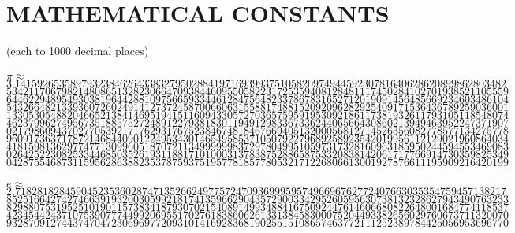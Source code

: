\documentclass{tufte-book}
\begin{document}
\section{MATHEMATICAL CONSTANTS}
(each to 1000 decimal places)
\\~\\$\pi\approx$\\
$3.14159265358979323846264338327950288419716939937510582097494459230781640628620899862803482$\\
$5342117067982148086513282306647093844609550582231725359408128481117450284102701938521105559$\\
$6446229489549303819644288109756659334461284756482337867831652712019091456485669234603486104$\\
$5432664821339360726024914127372458700660631558817488152092096282925409171536436789259036001$\\
$1330530548820466521384146951941511609433057270365759591953092186117381932611793105118548074$\\
$4623799627495673518857527248912279381830119491298336733624406566430860213949463952247371907$\\
$0217986094370277053921717629317675238467481846766940513200056812714526356082778577134275778$\\
$9609173637178721468440901224953430146549585371050792279689258923542019956112129021960864034$\\
$4181598136297747713099605187072113499999983729780499510597317328160963185950244594553469083$\\
$0264252230825334468503526193118817101000313783875288658753320838142061717766914730359825349$\\
$0428755468731159562863882353787593751957781857780532171226806613001927876611195909216420199$
\\~\\
$e\approx$\\
$2.71828182845904523536028747135266249775724709369995957496696762772407663035354759457138217$\\
$8525166427427466391932003059921817413596629043572900334295260595630738132328627943490763233$\\
$8298807531952510190115738341879307021540891499348841675092447614606680822648001684774118537$\\
$4234544243710753907774499206955170276183860626133138458300075204493382656029760673711320070$\\
$9328709127443747047230696977209310141692836819025515108657463772111252389784425056953696770$\\
\end{document}

